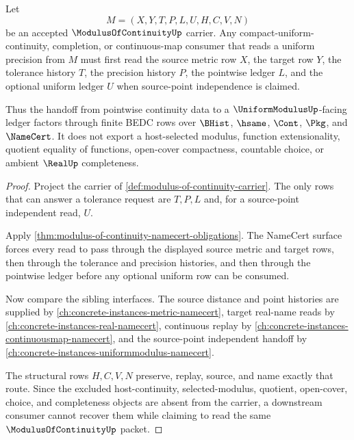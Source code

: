 \begin{theorem}
\label{thm:modulus-of-continuity-uniformization-handoff}
Let
$$
M=(X,Y,T,P,L,U,H,C,V,N)
$$
be an accepted $\ModulusOfContinuityUp$ carrier. Any compact-uniform-continuity, completion, or continuous-map consumer that reads a uniform precision from $M$ must first read the source metric row $X$, the target row $Y$, the tolerance history $T$, the precision history $P$, the pointwise ledger $L$, and the optional uniform ledger $U$ when source-point independence is claimed.

Thus the handoff from pointwise continuity data to a $\UniformModulusUp$-facing ledger factors through finite BEDC rows over $\BHist$, $\hsame$, $\Cont$, $\Pkg$, and $\NameCert$. It does not export a host-selected modulus, function extensionality, quotient equality of functions, open-cover compactness, countable choice, or ambient $\RealUp$ completeness.
\end{theorem}
\begin{proof}
Project the carrier of \autoref{def:modulus-of-continuity-carrier}. The only rows that can answer a tolerance request are $T,P,L$ and, for a source-point independent read, $U$.

Apply \autoref{thm:modulus-of-continuity-namecert-obligations}. The NameCert surface forces every read to pass through the displayed source metric and target rows, then through the tolerance and precision histories, and then through the pointwise ledger before any optional uniform row can be consumed.

Now compare the sibling interfaces. The source distance and point histories are supplied by \autoref{ch:concrete-instances-metric-namecert}, target real-name reads by \autoref{ch:concrete-instances-real-namecert}, continuous replay by \autoref{ch:concrete-instances-continuousmap-namecert}, and the source-point independent handoff by \autoref{ch:concrete-instances-uniformmodulus-namecert}.

The structural rows $H,C,V,N$ preserve, replay, source, and name exactly that route. Since the excluded host-continuity, selected-modulus, quotient, open-cover, choice, and completeness objects are absent from the carrier, a downstream consumer cannot recover them while claiming to read the same $\ModulusOfContinuityUp$ packet.
\end{proof}

